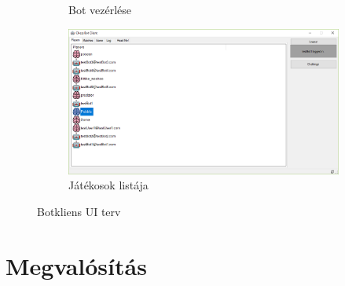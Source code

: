 \documentclass[twoside, a4paper, 12pt]{article}
\begin{document}
\begin{figure}
\begin{subfigure}[b]{0.475\textwidth}
		\caption{Bot vezérlése}
		\label{fig:botClientGame}
	\end{subfigure}
	\quad
	\begin{subfigure}[b]{0.475\textwidth}   
		\centering 
		\includegraphics[width=\textwidth]{img/botClientPlayers.png}
		\caption{Játékosok listája}
		\label{fig:botClientPlayers}
	\end{subfigure}
	\caption[ Botkliens UI terv ]
	{\small Botkliens UI terv}
	\label{fig:botClient}
\end{figure}


























































\newpage
\section{Megvalósítás}
\end{document}
